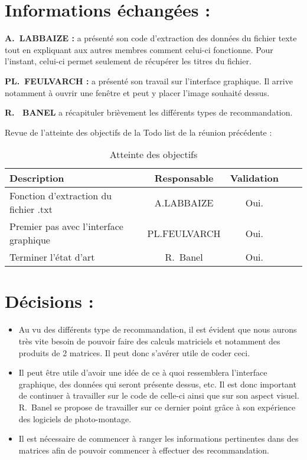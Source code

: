\documentclass[11pt]{meetingmins}
\begin{document}
\section{Informations échangées :}
\begin{hiddenitems}
\item
\textbf{A.~LABBAIZE : } a présenté son code d'extraction des données du fichier texte tout en expliquant aux autres membres comment celui-ci fonctionne. Pour l'instant, celui-ci permet seulement de récupérer les titres du fichier.
\item
\textbf{PL.~FEULVARCH : }a présenté son travail sur l'interface graphique. Il arrive notamment à ouvrir une fenêtre et peut y placer l'image souhaité dessus.
\item
\textbf{R. ~BANEL} a récapituler brièvement les différents types de recommandation.


\item Revue de l'atteinte des objectifs de la Todo list de la réunion précédente :
\begin{table}[h]
    \centering
    \begin{tabular}{|p{4cm}|c|c|c|c|}
    \hline
        \rowcolor{yellow} Description & Responsable & Validation
        \tabularnewline \hline
        Fonction d'extraction du fichier .txt &  A.LABBAIZE & Oui.
        \tabularnewline \hline
        Premier pas avec l'interface graphique & PL.FEULVARCH & Oui.
        \tabularnewline \hline
        Terminer l'état d'art  & R.~Banel & Oui. \tabularnewline \hline 

        
    \end{tabular}
    \caption{Atteinte des objectifs}
    \label{tab:my_label}
\end{table}

\end{hiddenitems}

\newpage

\section{Décisions :}
\begin{itemize}
    \item Au vu des différents type de recommandation, il est évident que nous aurons très vite besoin de pouvoir faire des calculs matriciels et notamment des produits de 2 matrices. Il peut donc s'avérer utile de coder ceci. 
    \item Il peut être utile d'avoir une idée de ce à quoi ressemblera l'interface graphique, des données qui seront présente dessus, etc. Il est donc important de continuer à travailler sur le code de celle-ci ainsi que sur son aspect visuel. R.~Banel se propose de travailler sur ce dernier point grâce à son expérience des logiciels de photo-montage.
    \item Il est nécessaire de commencer à ranger les informations pertinentes dans des matrices afin de pouvoir commencer à effectuer des recommandation.
\end{itemize}
\end{document}
